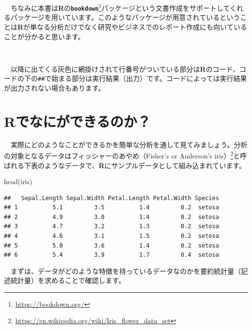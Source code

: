 \documentclass[
  12pt,
]{book}
\newenvironment{Shaded}{\begin{snugshade}}{\end{snugshade}}
\newcommand{\FunctionTok}[1]{\textcolor[rgb]{0.00,0.00,0.00}{#1}}
\newcommand{\NormalTok}[1]{#1}
\DeclareRobustCommand{\href}[2]{#2\footnote{\url{#1}}}
\begin{document}
　ちなみに本書は\textbf{R}の\href{https://bookdown.org/}{\textbf{\texttt{bookdown}}}パッケージという文書作成をサポートしてくれるパッケージを用いています。このようなパッケージが用意されているということは\textbf{R}が単なる分析だけでなく研究やビジネスでのレポート作成にも向いていることが分かると思います。

　

\begin{hint-box}
　以降に出てくる灰色に網掛けされて行番号がついている部分は\textbf{R}のコード、コードの下の\texttt{\#\#}で始まる部分は実行結果（出力）です。コードによっては実行結果が出力されない場合もあります。

\end{hint-box}

\newpage

\hypertarget{rux3067ux306aux306bux304cux3067ux304dux308bux306eux304b}{%
\section*{\texorpdfstring{\textbf{R}でなにができるのか？}{Rでなにができるのか？}}\label{rux3067ux306aux306bux304cux3067ux304dux308bux306eux304b}}

　実際にどのようなことができるかを簡単な分析を通して見てみましょう。分析の対象となるデータは\href{https://en.wikipedia.org/wiki/Iris_flower_data_set}{フィッシャーのあやめ（Fisher's or Anderson's iris）}と呼ばれる下表のようなデータで、\textbf{R}にサンプルデータとして組み込まれています。

\begin{Shaded}
\begin{Highlighting}[numbers=left,,]
\FunctionTok{head}\NormalTok{(iris)}
\end{Highlighting}
\end{Shaded}

\begin{verbatim}
##   Sepal.Length Sepal.Width Petal.Length Petal.Width Species
## 1          5.1         3.5          1.4         0.2  setosa
## 2          4.9         3.0          1.4         0.2  setosa
## 3          4.7         3.2          1.3         0.2  setosa
## 4          4.6         3.1          1.5         0.2  setosa
## 5          5.0         3.6          1.4         0.2  setosa
## 6          5.4         3.9          1.7         0.4  setosa
\end{verbatim}

　まずは、データがどのような特徴を持っているデータなのかを要約統計量（記述統計量）を求めることで確認します。
\end{document}
